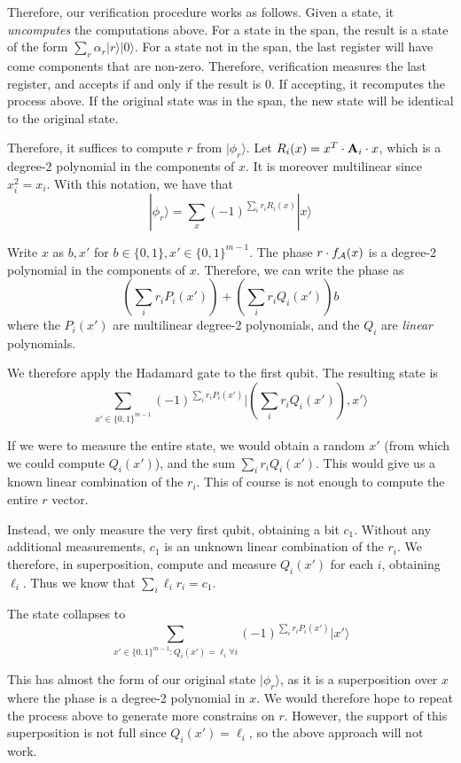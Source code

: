 Therefore, our verification procedure works as follows.  Given a state, it \emph{uncomputes} the computations above.  For a state in the span, the result is a state of the form $\sum_r \alpha_r |r\rangle|0\rangle$.  For a state not in the span, the last register will have come components that are non-zero.  Therefore, verification measures the last register, and accepts if and only if the result is 0.  If accepting, it recomputes the process above.  If the original state was in the span, the new state will be identical to the original state.

\medskip

Therefore, it suffices to compute $r$ from $|\phi_r\rangle$.  Let $R_i(x) = x^T\cdot{\mathbf{A}}_i\cdot x$, which is a degree-2 polynomial in the components of $x$.  It is moreover multilinear since $x_i^2=x_i$.  With this notation, we have that \[|\phi_r\rangle=\sum_x (-1)^{\sum_i r_i R_i(x)}|x\rangle\]

Write $x$ as $b,x'$ for $b\in\{0,1\},x'\in\{0,1\}^{m-1}$.  The phase $r\cdot f_{\mathcal{A}}(x)$ is a degree-2 polynomial in the components of $x$.  Therefore, we can write the phase as \[\left(\sum_i r_i P_i(x')\right)+\left(\sum_i r_i Q_i(x')\right)b\]
where the $P_i(x')$ are multilinear degree-2 polynomials, and the $Q_i$ are \emph{linear} polynomials.  

We therefore apply the Hadamard gate to the first qubit.  The resulting state is
\[\sum_{x'\in\{0,1\}^{m-1}}(-1)^{\sum_i r_i P_i(x')}|\left(\sum_i r_i Q_i(x')\right),x'\rangle\]

If we were to measure the entire state, we would obtain a random $x'$ (from which we could compute $Q_i(x')$), and the sum $\sum_i r_i Q_i(x')$.  This would give us a known linear combination of the $r_i$.  This of course is not enough to compute the entire $r$ vector.  

Instead, we only measure the very first qubit, obtaining a bit $c_1$.  Without any additional measurements, $c_1$ is an unknown linear combination of the $r_i$.  We therefore, in superposition, compute and measure $Q_i(x')$ for each $i$, obtaining $\ell_i$.  Thus we know that $\sum_{i} \ell_i r_i = c_1$.

The state collapses to 
\[\sum_{x'\in\{0,1\}^{m-1}:Q_i(x')=\ell_i\forall i}(-1)^{\sum_i r_i P_i(x')}|x'\rangle\]

This has almost the form of our original state $|\phi_r\rangle$, as it is a superposition over $x$ where the phase is a degree-2 polynomial in $x$.  We would therefore hope to repeat the process above to generate more constrains on $r$.  However, the support of this superposition is not full since $Q_i(x')=\ell_i$, so the above approach will not work.


